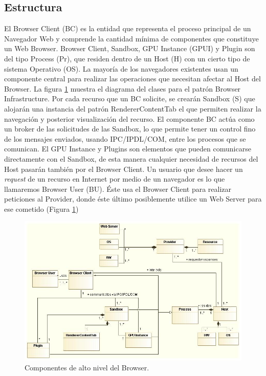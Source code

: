\subsection{Estructura}
El Browser Client (BC) es la entidad que representa el proceso principal de un Navegador Web y comprende la cantidad mínima de componentes que constituye un Web Browser. Browser Client, Sandbox, GPU Instance (GPUI) y Plugin son del tipo Process (Pr), que residen dentro de un Host (H) con un cierto tipo de sistema Operativo (OS). La mayoría de los navegadores existentes usan un componente central para realizar las operaciones que necesitan afectar al Host del Browser. La figura \ref{fig:BIPatt} muestra el diagrama del clases para el patrón Browser Infrastructure. Por cada recurso que un BC solicite, se crearán Sandbox (S) que alojarán una instancia del patrón RendererContentTab el que permiten realizar la navegación y posterior visualización del recurso.
El componente BC actúa como un broker de las solicitudes de las Sandbox, lo que permite tener un control fino de los mensajes enviados, usando IPC/IPDL/COM, entre los procesos que se comunican. El GPU Instance y Plugins son elementos que pueden comunicarse directamente con el Sandbox, de esta manera cualquier necesidad de recursos del Host pasarán también por el Browser Client. 
Un usuario que desee hacer un \textit{request} de un recurso en Internet por medio de un navegador es lo que llamaremos Browser User (BU). Éste usa el Browser Client para realizar peticiones al Provider, donde éste último posiblemente utilice un Web Server para ese cometido (Figura \ref{fig:BIPatt})

	    \begin{figure}[h!t]
	        \centering
	        \includegraphics[scale=0.5]{figures/chap4/browserInfraPattern_v2.jpg}
	        \caption{Componentes de alto nivel del Browser.}
	        \label{fig:BIPatt}
	    \end{figure}


